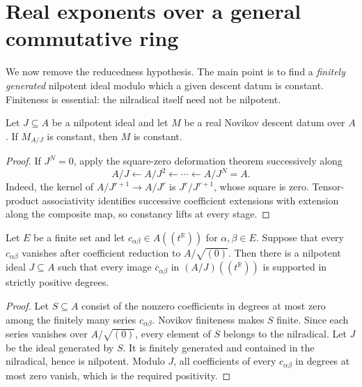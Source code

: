 \section{Real exponents over a general commutative ring}
\label{sec:real_novikov_descent}

We now remove the reducedness hypothesis.  The main point is to find a
\emph{finitely generated} nilpotent ideal modulo which a given descent datum is
constant.  Finiteness is essential: the nilradical itself need not be
nilpotent.

\begin{lemma}
  \label{lem:novikov_descent_nilpotent}
  \leanok
  Let $J\subseteq A$ be a nilpotent ideal and let $M$ be a real Novikov
  descent datum over $A$.  If $M_{A/J}$ is constant, then $M$ is constant.
\end{lemma}

\begin{proof}
  \leanok
  If $J^N=0$, apply the square-zero deformation theorem successively along
  \[
    A/J\longleftarrow A/J^2\longleftarrow\cdots
      \longleftarrow A/J^N=A.
  \]
  Indeed, the kernel of $A/J^{r+1}\to A/J^r$ is $J^r/J^{r+1}$, whose square
  is zero.  Tensor-product associativity identifies successive coefficient
  extensions with extension along the composite map, so constancy lifts at
  every stage.
\end{proof}

\begin{lemma}
  \label{lem:nilpotent_positive_frobenius_errors}
  \leanok
  Let $E$ be a finite set and let
  $c_{\alpha\beta}\in A((t^{\mathbb{R}}))$ for $\alpha,\beta\in E$.  Suppose
  that every $c_{\alpha\beta}$ vanishes after coefficient reduction to
  $A/\sqrt{(0)}$.  Then there is a nilpotent ideal $J\subseteq A$ such that
  every image $\overline c_{\alpha\beta}$ in
  $(A/J)((t^{\mathbb{R}}))$ is supported in strictly positive degrees.
\end{lemma}

\begin{proof}
  \leanok
  Let $S\subseteq A$ consist of the nonzero coefficients in degrees at most
  zero among the finitely many series $c_{\alpha\beta}$.  Novikov finiteness
  makes $S$ finite.  Since each series vanishes over $A/\sqrt{(0)}$, every
  element of $S$ belongs to the nilradical.  Let $J$ be the ideal generated by
  $S$.  It is finitely generated and contained in the nilradical, hence is
  nilpotent.  Modulo $J$, all coefficients of every $c_{\alpha\beta}$ in
  degrees at most zero vanish, which is the required positivity.
\end{proof}

